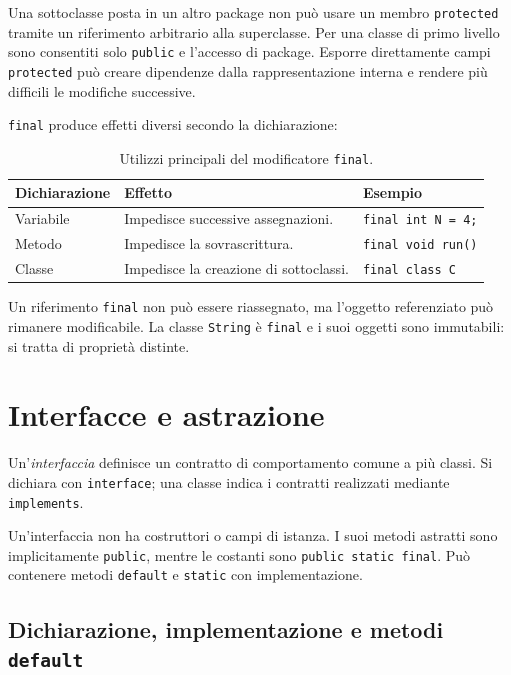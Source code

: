 Una sottoclasse posta in un altro package non può usare un
membro \texttt{protected} tramite un riferimento arbitrario alla
superclasse. Per una classe di primo livello sono consentiti solo
\texttt{public} e l'accesso di package. Esporre direttamente
campi \texttt{protected} può creare dipendenze dalla rappresentazione
interna e rendere più difficili le modifiche successive.

\texttt{final} produce effetti diversi secondo la dichiarazione:

\begin{table}[htbp]
\centering
\begin{tabular}{p{2.6cm}p{6.5cm}p{3.0cm}}
\toprule
Dichiarazione & Effetto & Esempio \\
\midrule
Variabile & Impedisce successive assegnazioni. & \texttt{final int N = 4;} \\
Metodo & Impedisce la sovrascrittura. & \texttt{final void run()} \\
Classe & Impedisce la creazione di sottoclassi. & \texttt{final class C} \\
\bottomrule
\end{tabular}
\caption{Utilizzi principali del modificatore \texttt{final}.}
\label{tab:fi-java-interfacce-final}
\end{table}

Un riferimento \texttt{final} non può essere riassegnato, ma
l'oggetto referenziato può rimanere modificabile. La classe
\texttt{String} è \texttt{final} e i suoi oggetti sono immutabili:
si tratta di proprietà distinte.

\section{Interfacce e astrazione}
\label{sec:fi-java-interfacce-astrazione}

\begin{definition}
\label{def:fi-java-interfaccia}
Un'\emph{interfaccia} definisce un contratto di comportamento
comune a più classi. Si dichiara con \texttt{interface}; una
classe indica i contratti realizzati mediante \texttt{implements}.
\end{definition}

Un'interfaccia non ha costruttori o campi di istanza. I suoi
metodi astratti sono implicitamente \texttt{public}, mentre le
costanti sono \texttt{public static final}. Può contenere
metodi \texttt{default} e \texttt{static} con implementazione.

\subsection{Dichiarazione, implementazione e metodi \texttt{default}}
\label{sec:fi-java-interfacce-implementazione}

